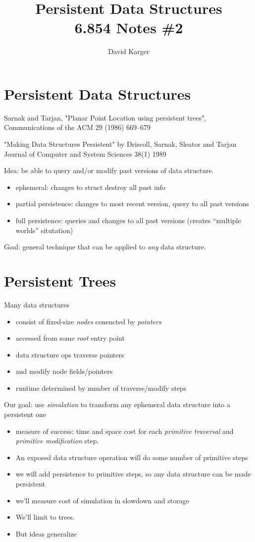 \documentclass{article}
\title{Persistent Data Structures\\ 6.854 Notes \#2}
\author{David Karger}
\begin{document}

\section{Persistent Data Structures}


Sarnak and Tarjan, "Planar Point Location using persistent trees",
Communications of the ACM 29 (1986) 669--679

"Making Data Structures Persistent" by Driscoll, Sarnak, Sleator and Tarjan 
Journal of Computer and System Sciences 38(1) 1989

Idea: be able to query and/or modify past versions of data structure.
\begin{itemize}
\item ephemeral: changes to struct destroy all past info
\item partial persistence: changes to most recent version, query to
  all past versions
\item full persistence: queries and changes to all past versions
  (creates ``multiple worlds'' situtation)
\end{itemize}

Goal: general technique that can be applied to \emph{any} data
structure.



\section{Persistent Trees}

Many data structures
\begin{itemize}
\item consist of fixed-size \emph{nodes}
  conencted by \emph{pointers}
\item accessed from some \emph{root} entry point
\item data structure ops traverse pointers
\item and modify node fields/pointers
\item runtime determined by number of traverse/modify steps
\end{itemize}

Our goal: use \emph{simulation} to transform any ephemeral data
structure into a persistent one
\begin{itemize}
\item measure of success: time and space cost for each \emph{primitive
    traversal} and \emph{primitive modification} step.
\item An exposed data structure operation will do some number of
  primitive steps
\item we will add persistence to primitive steps, so any data
  structure can be made persistent
\item we'll measure cost of simulation in slowdown and storage
\item We'll limit to trees.
\item But ideas generalize
\end{itemize}
\end{document}
